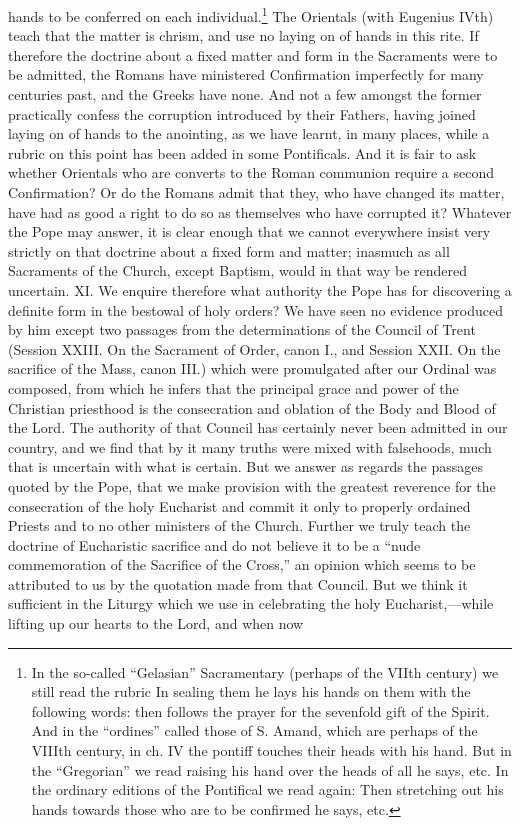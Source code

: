 hands to be conferred on each individual.\footnote{In the so-called “Gelasian” Sacramentary (perhaps of the VIIth century) we still read the rubric In sealing them he lays his hands on them with the following words: then follows the prayer for the sevenfold gift of the Spirit. And in the “ordines” called those of S. Amand, which are perhaps of the VIIIth century, in ch. IV the pontiff touches their heads with his hand. But in the “Gregorian” we read raising his hand over the heads of all he says, etc. In the ordinary editions of the Pontifical we read again: Then stretching out his hands towards those who are to be confirmed he says, etc.} The Orientals (with Eugenius IVth) teach that the matter is chrism, and use no laying on of hands in this rite. If therefore the doctrine about a fixed matter and form in the Sacraments were to be admitted, the Romans have ministered Confirmation imperfectly for many centuries past, and the Greeks have none. And not a few amongst the former practically confess the corruption introduced by their Fathers, having joined laying on of hands to the anointing, as we have learnt, in many places, while a rubric on this point has been added in some Pontificals. And it is fair to ask whether Orientals who are converts to the Roman communion require a second Confirmation? Or do the Romans admit that they, who have changed its matter, have had as good a right to do so as themselves who have corrupted it? Whatever the Pope may answer, it is clear enough that we cannot everywhere insist very strictly on that doctrine about a fixed form and matter; inasmuch as all Sacraments of the Church, except Baptism, would in that way be rendered uncertain. XI. We enquire therefore what authority the Pope has for discovering a definite form in the bestowal of holy orders? We have seen no evidence produced by him except two passages from the determinations of the Council of Trent (Session XXIII. On the Sacrament of Order, canon I., and Session XXII. On the sacrifice of the Mass, canon III.) which were promulgated after our Ordinal was composed, from which he infers that the principal grace and power of the Christian priesthood is the consecration and oblation of the Body and Blood of the Lord. The authority of that Council has certainly never been admitted in our country, and we find that by it many truths were mixed with falsehoods, much that is uncertain with what is certain. But we answer as regards the passages quoted by the Pope, that we make provision with the greatest reverence for the consecration of the holy Eucharist and commit it only to properly ordained Priests and to no other ministers of the Church. Further we truly teach the doctrine of Eucharistic sacrifice and do not believe it to be a “nude commemoration of the Sacrifice of the Cross,” an opinion which seems to be attributed to us by the quotation made from that Council. But we think it sufficient in the Liturgy which we use in celebrating the holy Eucharist,—while lifting up our hearts to the Lord, and when now

